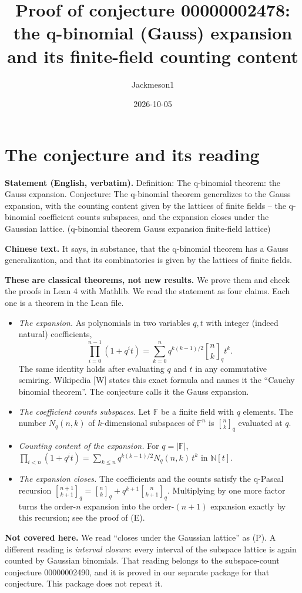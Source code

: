 \documentclass[11pt]{article}
\title{Proof of conjecture 00000002478:\\ the q-binomial (Gauss) expansion and its finite-field counting content}
\author{Jackmeson1}
\date{2026-10-05}
\theoremstyle{definition}
\newcommand{\qb}[2]{\genfrac{[}{]}{0pt}{}{#1}{#2}_{q}}
\newcommand{\F}{\mathbb{F}}
\begin{document}
\maketitle

\section{The conjecture and its reading}

\textbf{Statement (English, verbatim).} Definition: The q-binomial theorem: the Gauss
expansion. Conjecture: The q-binomial theorem generalizes to the Gauss expansion, with the
counting content given by the lattices of finite fields -- the q-binomial coefficient counts
subspaces, and the expansion closes under the Gaussian lattice. (q-binomial theorem Gauss
expansion finite-field lattice)

\textbf{Chinese text.} It says, in substance, that the q-binomial theorem has a Gauss
generalization, and that its combinatorics is given by the lattices of finite fields.

\textbf{These are classical theorems, not new results.} We prove them and check the proofs in
Lean 4 with Mathlib. We read the statement as four claims. Each one is a theorem in the Lean
file.
\begin{itemize}
\item[(E)] \emph{The expansion.} As polynomials in two variables $q,t$ with integer (indeed
  natural) coefficients,
  \[\prod_{i=0}^{n-1}(1+q^it)=\sum_{k=0}^{n}q^{k(k-1)/2}\qb{n}{k}t^k .\]
  The same identity holds after evaluating $q$ and $t$ in any commutative semiring. Wikipedia
  [W] states this exact formula and names it the ``Cauchy binomial theorem''. The conjecture
  calls it the Gauss expansion.
\item[(C1)] \emph{The coefficient counts subspaces.} Let $\F$ be a finite field with $q$
  elements. The number $N_q(n,k)$ of $k$-dimensional subspaces of $\F^n$ is $\qb{n}{k}$
  evaluated at $q$.
\item[(C2)] \emph{Counting content of the expansion.} For $q=|\F|$,
  $\prod_{i<n}(1+q^it)=\sum_{k\le n}q^{k(k-1)/2}N_q(n,k)\,t^k$ in $\mathbb{N}[t]$.
\item[(P)] \emph{The expansion closes.} The coefficients and the counts satisfy the q-Pascal
  recursion $\qb{n+1}{k+1}=\qb{n}{k}+q^{k+1}\qb{n}{k+1}$. Multiplying by one more factor turns
  the order-$n$ expansion into the order-$(n+1)$ expansion exactly by this recursion; see the
  proof of (E).
\end{itemize}
\textbf{Not covered here.} We read ``closes under the Gaussian lattice'' as (P). A different
reading is \emph{interval closure}: every interval of the subspace lattice is again counted by
Gaussian binomials. That reading belongs to the subspace-count conjecture 00000002490, and it is
proved in our separate package for that conjecture. This package does not repeat it.
\end{document}
